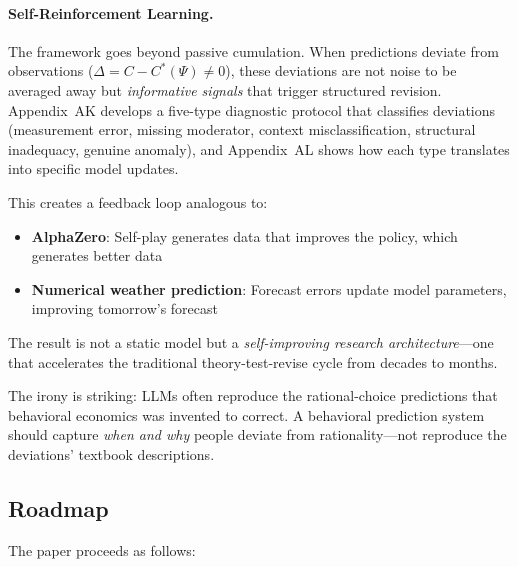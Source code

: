 \paragraph{Self-Reinforcement Learning.}
The framework goes beyond passive cumulation. When predictions deviate from observations ($\Delta = C - C^*(\Psi) \neq 0$), these deviations are not noise to be averaged away but \emph{informative signals} that trigger structured revision. Appendix~AK develops a five-type diagnostic protocol that classifies deviations (measurement error, missing moderator, context misclassification, structural inadequacy, genuine anomaly), and Appendix~AL shows how each type translates into specific model updates.

This creates a feedback loop analogous to:
\begin{itemize}
    \item \textbf{AlphaZero}: Self-play generates data that improves the policy, which generates better data
    \item \textbf{Numerical weather prediction}: Forecast errors update model parameters, improving tomorrow's forecast
\end{itemize}

The result is not a static model but a \emph{self-improving research architecture}---one that accelerates the traditional theory-test-revise cycle from decades to months.

The irony is striking: LLMs often reproduce the rational-choice predictions that behavioral economics was invented to correct. A behavioral prediction system should capture \emph{when and why} people deviate from rationality---not reproduce the deviations' textbook descriptions.

\subsection{Roadmap}
\label{sec:intro-roadmap}

The paper proceeds as follows:

